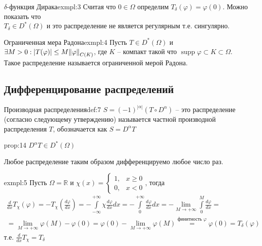 \documentclass[12pt,a4paper]{article}
\newcommand{\Real}{\mathbb{R}}
\DeclareMathOperator\supp{supp}
\begin{document}
\begin{example}{$\delta$-функция Дирака}{exmpl:3}
	Считая что $0 \in \Omega$ определим $T_\delta (\varphi) = \varphi(0)$. Можно показать что \\ $T_\delta \in D^* (\Omega)$ и это распределение не является регулярным т.е. сингулярно.
\end{example}

\begin{example}{Ограниченная мера Радона}{exmpl:4}
	Пусть $T \in D^* (\Omega)$ и $\exists M > 0: |T(\varphi)| \leq M \norm{\varphi}_{C(K)}$, где $K$ -- компакт такой что $\supp \varphi \subset K \subset \Omega$. Такое распределение называется ограниченной мерой Радона.
\end{example}

\subsection{Дифференцирование распределений}

\begin{definition}{Производная распределения}{def:7}
	$S = (-1)^{|\alpha|} (T \circ D^\alpha)$ -- это распределение (согласно следующему утверждению) называется частной производной распределения $T$, обозначается как $S = D^\alpha T$
\end{definition}

\begin{proposition}{}{prop:14}
	$D^\alpha T \in D^* (\Omega)$
\end{proposition}
Любое распределение таким образом дифференцируемо любое число раз.

\begin{example}{}{exmpl:5}
	Пусть $\Omega = \Real$ и $\chi(x) = 
	\begin{cases}
		1, &x \geq 0 \\
		0, &x < 0
	\end{cases}$, тогда 
	\begin{multline*}
		\frac{d}{dx}T_{\chi} (\varphi) = -T_{\chi}\left(\frac{d\varphi}{dx}\right) = -\int\limits_{-\infty}^{+\infty}{\chi \frac{d\varphi}{dx} dx} = -\int\limits_{0}^{+\infty}{\frac{d\varphi}{dx} dx} = -\lim_{M\to +\infty}{\int\limits_{0}^{M}{\frac{d\varphi}{dx}}} = \\ =\lim_{M\to +\infty}{\varphi(M) - \varphi(0)} = \varphi(0) - \lim_{M\to +\infty}{\varphi(M)} \overset{\text{финитность } \varphi}{=} \varphi(0) = T_\delta (\varphi)
	\end{multline*}
	т.е. $\frac{d}{dx}T_\chi = T_\delta$
\end{example}
\end{document}
